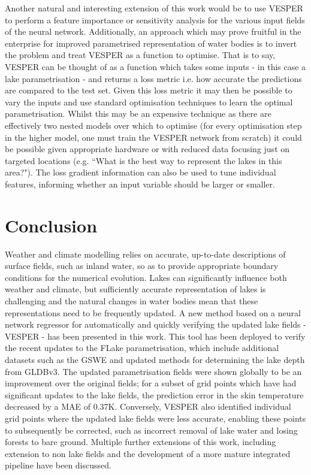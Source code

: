 \documentclass[hess, twostagejnl]{copernicus}
\begin{document}
Another natural and interesting extension of this work would be to use VESPER to perform a feature importance or sensitivity analysis for the various input fields of the neural network. Additionally, an approach which may prove fruitful in the enterprise for improved parametrised representation of water bodies is to invert the problem and treat VESPER as a function to optimise. That is to say, VESPER can be thought of as a function which takes some inputs - in this case a lake parametrisation - and returns a loss metric i.e. how accurate the predictions are compared to the test set. Given this loss metric it may then be possible to vary the inputs and use standard optimisation techniques to learn the optimal parametrisation. Whilst this may be an expensive technique as there are effectively two nested models over which to optimise (for every optimisation step in the higher model, one must train the VESPER network from scratch) it could be possible given appropriate hardware or with reduced data focusing just on targeted locations (e.g. “What is the best way to represent the lakes in this area?"). The loss gradient information can also be used to tune individual features, informing whether an input variable should be larger or smaller.




\section{Conclusion}\label{sec:conclusion}
Weather and climate modelling relies on accurate, up-to-date descriptions of surface fields, such as inland water, so as to provide appropriate boundary conditions for the numerical evolution. Lakes can significantly influence both weather and climate, but sufficiently  accurate  representation  of  lakes  is  challenging  and  the  natural  changes  in  water  bodies  mean  that  these representations  need  to  be  frequently  updated.  A  new  method  based  on  a  neural  network  regressor  for  automatically  and quickly verifying the updated lake fields - VESPER - has been presented in this work. This tool has been deployed to verify the recent updates to the FLake parametrisation, which include additional datasets such as the GSWE and updated methods for determining the lake depth from GLDBv3. The updated parametrisation fields were shown globally to be an improvement over the original fields; for a subset of grid points which have had significant updates to the lake fields, the prediction error in the skin temperature decreased by a MAE of 0.37K. Conversely, VESPER also identified individual grid points where the updated lake fields were less accurate, enabling these points to subsequently be corrected, such as incorrect removal of lake water and losing forests to bare ground. Multiple further extensions of this work, including extension to non lake fields and the development of a more mature integrated pipeline have been discussed.
\end{document}
